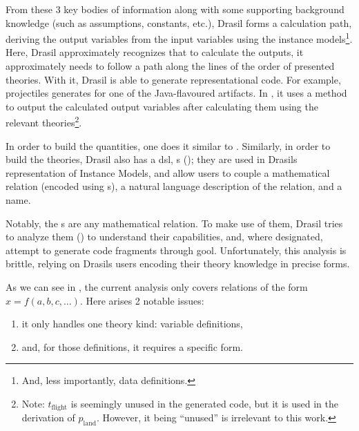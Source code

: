 From these 3 key bodies of information along with some supporting background
knowledge (such as assumptions, constants, etc.), Drasil forms a calculation
path, deriving the output variables from the input variables using the instance
models\footnote{And, less importantly, data definitions.}. Here, Drasil
approximately recognizes that to calculate the outputs, it approximately needs
to follow a path along the lines of the order of presented theories. With it,
Drasil is able to generate representational code. For example, \acsp{projectile}
generates  for one of the Java-flavoured
artifacts. In , it uses a
 method to output the calculated output variables
after calculating them using the relevant theories\footnote{Note:
\(t_\text{flight}\) is seemingly unused in the generated code, but it is used in
the derivation of \(p_\text{land}\). However, it being ``unused'' is irrelevant
to this work.}.

\originalJavaProjectileMain{}

In order to build the quantities, one does it similar to
. Similarly, in order to build the
theories, Drasil also has a \acs{dsl}, \RelationConcept{}s
(); they are used in Drasils representation of
Instance Models, and allow users to couple a mathematical relation (encoded
using \Relation{}s), a natural language description of the relation, and a name.

\originalRelationConcept{}

Notably, the \Relation{}s are any mathematical relation. To make use of them,
Drasil tries to analyze them () to understand their
capabilities, and, where designated, attempt to generate code fragments through
\acs{gool}. Unfortunately, this analysis is brittle, relying on Drasils users
encoding their theory knowledge in precise forms.

\originalRelToQDHaskell{}

As we can see in , the current analysis only covers
relations of the form \(x = f(a, b, c, \ldots{})\). Here arises 2 notable
issues:
\begin{enumerate}
    \item[\namedlabel{mk:issue:1}{Issue 1}] it only handles one theory kind:
    variable definitions,
    \item[\namedlabel{mk:issue:2}{Issue 2}] and, for those definitions, it
    requires a specific form.
\end{enumerate}

